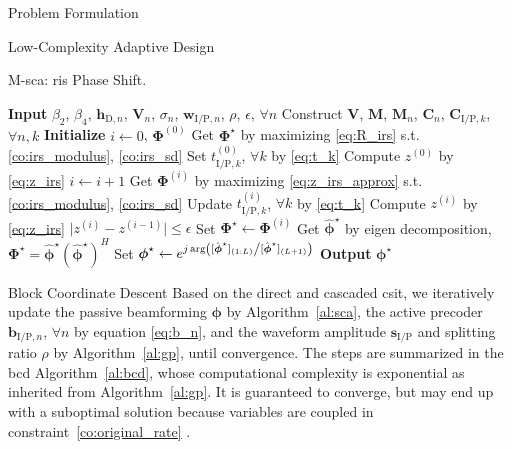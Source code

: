 \begin{section}{Problem Formulation}
\begin{subsection}{Low-Complexity Adaptive Design}
		\begin{algorithm}[!t]
			\caption{M-\gls{sca}: \gls{ris} Phase Shift.}
			\label{al:m_sca}
			\begin{algorithmic}[1]
				\State \textbf{Input} $\beta_2$, $\beta_4$, $\boldsymbol{h}_{\mathrm{D},n}$, $\boldsymbol{V}_{n}$, $\sigma_n$, $\boldsymbol{w}_{\mathrm{I/P},n}$, $\rho$, $\epsilon$, $\forall n$
				\State Construct $\boldsymbol{V}$, $\boldsymbol{M}$, $\boldsymbol{M}_n$, $\boldsymbol{C}_{n}$, $\boldsymbol{C}_{\mathrm{I/P},k}$, $\forall n,k$
				\State \textbf{Initialize} $i \gets 0$, $\boldsymbol{\Phi}^{(0)}$
					\State Get $\boldsymbol{\Phi}^{\star}$ by maximizing \eqref{eq:R_irs} s.t. \eqref{co:irs_modulus}, \eqref{co:irs_sd}
				\Else
					\State Set $t_{\mathrm{I/P},k}^{(0)}$, $\forall k$ by \eqref{eq:t_k}
					\State Compute $z^{(0)}$ by \eqref{eq:z_irs}
					\Repeat
						\State $i \gets i + 1$
							\State Get $\boldsymbol{\Phi}^{(i)}$ by maximizing \eqref{eq:z_irs_approx} s.t. \eqref{co:irs_modulus}, \eqref{co:irs_sd}
							\State Update $t_{\mathrm{I/P},k}^{(i)}$, $\forall k$ by \eqref{eq:t_k}
							\State Compute $z^{(i)}$ by \eqref{eq:z_irs}
					\Until $\lvert z^{(i)}-z^{(i-1)} \rvert \le \epsilon$
					\State Set $\boldsymbol{\Phi}^{\star} \gets \boldsymbol{\Phi}^{(i)}$
				\EndIf
				\State Get $\hat{\boldsymbol{\phi}}^\star$ by eigen decomposition, $\boldsymbol{\Phi}^{\star}=\hat{\boldsymbol{\phi}}^\star(\hat{\boldsymbol{\phi}}^\star)^H$
				\State Set $\boldsymbol{\phi}^{\star} \gets e^{j \arg\left([\hat{\boldsymbol{\phi}}^\star]_{(1:L)} \middle/ [\hat{\boldsymbol{\phi}}^\star]_{(L+1)}\right)}$
				\State \textbf{Output} $\boldsymbol{\phi}^{\star}$
			\end{algorithmic}
		\end{algorithm}
	\end{subsection}


	\begin{subsection}{Block Coordinate Descent}
		Based on the direct and cascaded \gls{csit}, we iteratively update the passive beamforming $\boldsymbol{\phi}$ by Algorithm~\ref{al:sca}, the active precoder $\boldsymbol{b}_{\mathrm{I/P},n}$, $\forall n$ by equation \eqref{eq:b_n}, and the waveform amplitude $\boldsymbol{s}_{\mathrm{I/P}}$ and splitting ratio $\rho$ by Algorithm~\ref{al:gp}, until convergence. The steps are summarized in the \gls{bcd} Algorithm~\ref{al:bcd}, whose computational complexity is exponential as inherited from Algorithm~\ref{al:gp}. It is guaranteed to converge, but may end up with a suboptimal solution because variables are coupled in constraint~\eqref{co:original_rate} \cite{Grippo2000}.


\end{subsection}
\end{section}
